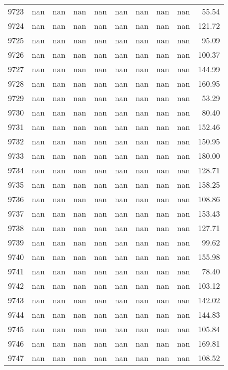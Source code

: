 \begin{tabular}{lrrrrrrrrr}
9723 & nan & nan & nan & nan & nan & nan & nan & nan & 55.54 \\
9724 & nan & nan & nan & nan & nan & nan & nan & nan & 121.72 \\
9725 & nan & nan & nan & nan & nan & nan & nan & nan & 95.09 \\
9726 & nan & nan & nan & nan & nan & nan & nan & nan & 100.37 \\
9727 & nan & nan & nan & nan & nan & nan & nan & nan & 144.99 \\
9728 & nan & nan & nan & nan & nan & nan & nan & nan & 160.95 \\
9729 & nan & nan & nan & nan & nan & nan & nan & nan & 53.29 \\
9730 & nan & nan & nan & nan & nan & nan & nan & nan & 80.40 \\
9731 & nan & nan & nan & nan & nan & nan & nan & nan & 152.46 \\
9732 & nan & nan & nan & nan & nan & nan & nan & nan & 150.95 \\
9733 & nan & nan & nan & nan & nan & nan & nan & nan & 180.00 \\
9734 & nan & nan & nan & nan & nan & nan & nan & nan & 128.71 \\
9735 & nan & nan & nan & nan & nan & nan & nan & nan & 158.25 \\
9736 & nan & nan & nan & nan & nan & nan & nan & nan & 108.86 \\
9737 & nan & nan & nan & nan & nan & nan & nan & nan & 153.43 \\
9738 & nan & nan & nan & nan & nan & nan & nan & nan & 127.71 \\
9739 & nan & nan & nan & nan & nan & nan & nan & nan & 99.62 \\
9740 & nan & nan & nan & nan & nan & nan & nan & nan & 155.98 \\
9741 & nan & nan & nan & nan & nan & nan & nan & nan & 78.40 \\
9742 & nan & nan & nan & nan & nan & nan & nan & nan & 103.12 \\
9743 & nan & nan & nan & nan & nan & nan & nan & nan & 142.02 \\
9744 & nan & nan & nan & nan & nan & nan & nan & nan & 144.83 \\
9745 & nan & nan & nan & nan & nan & nan & nan & nan & 105.84 \\
9746 & nan & nan & nan & nan & nan & nan & nan & nan & 169.81 \\
9747 & nan & nan & nan & nan & nan & nan & nan & nan & 108.52 \\

\end{tabular}
